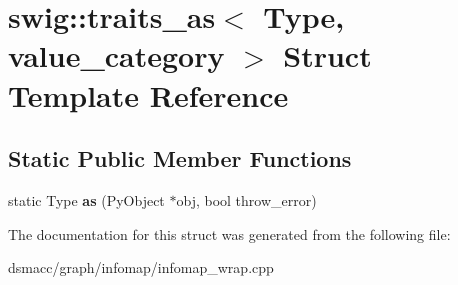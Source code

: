 \hypertarget{structswig_1_1traits__as_3_01Type_00_01value__category_01_4}{}\section{swig\+:\+:traits\+\_\+as$<$ Type, value\+\_\+category $>$ Struct Template Reference}
\label{structswig_1_1traits__as_3_01Type_00_01value__category_01_4}
\subsection*{Static Public Member Functions}
\begin{DoxyCompactItemize}
\item 
\mbox{\label{structswig_1_1traits__as_3_01Type_00_01value__category_01_4_addd7e404759a0808fa9f342f7a0f887b}} 
static Type {\bfseries as} (Py\+Object $\ast$obj, bool throw\+\_\+error)
\end{DoxyCompactItemize}


The documentation for this struct was generated from the following file\+:\begin{DoxyCompactItemize}
\item 
dsmacc/graph/infomap/infomap\+\_\+wrap.\+cpp\end{DoxyCompactItemize}
